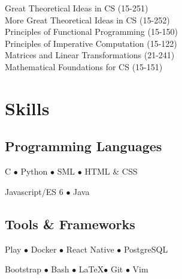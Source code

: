 \documentclass[]{resume-font}
\begin{document}
\begin{minipage}[t]{0.40\textwidth}
Great Theoretical Ideas in CS (15-251) \\
More Great Theoretical Ideas in CS (15-252) \\
Principles of Functional Programming (15-150) \\

Principles of Imperative Computation (15-122) \\
Matrices and Linear Transformations (21-241) \\
Mathematical Foundations for CS (15-151)
\sectionsep


\section{Skills}
\subsection{Programming Languages}
\vspace{\topsep}
C \(\bullet\)
Python \(\bullet\)
SML \(\bullet\)
HTML \& CSS

Javascript/ES 6 \(\bullet\)
Java

\sectionsep

\subsection{Tools \& Frameworks}
\vspace{\topsep}
Play \(\bullet\)
Docker \(\bullet\)
React Native \(\bullet\)
PostgreSQL

Bootstrap \(\bullet\)
Bash \(\bullet\)
\LaTeX \(\bullet\)
Git \(\bullet\)
Vim
\sectionsep

%
%

\end{minipage} 
\hfill
\end{document}
